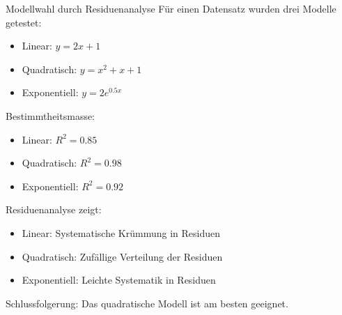\begin{example2}{Modellwahl durch Residuenanalyse}
Für einen Datensatz wurden drei Modelle getestet:
\begin{itemize}
  \item Linear: $y = 2x + 1$
  \item Quadratisch: $y = x^2 + x + 1$
  \item Exponentiell: $y = 2e^{0.5x}$
\end{itemize}

Bestimmtheitsmasse:
\begin{itemize}
  \item Linear: $R^2 = 0.85$
  \item Quadratisch: $R^2 = 0.98$
  \item Exponentiell: $R^2 = 0.92$
\end{itemize}

Residuenanalyse zeigt:
\begin{itemize}
  \item Linear: Systematische Krümmung in Residuen
  \item Quadratisch: Zufällige Verteilung der Residuen
  \item Exponentiell: Leichte Systematik in Residuen
\end{itemize}

Schlussfolgerung: Das quadratische Modell ist am besten geeignet.
\end{example2}

